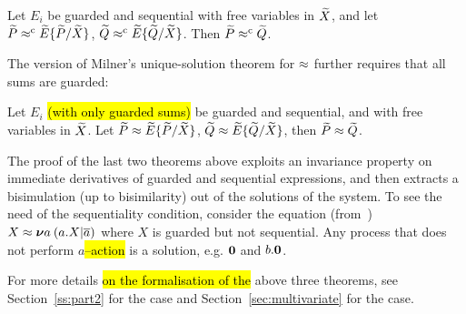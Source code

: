 \begin{theorem}
\label{t:Mil89s3}
Let $E_i$ be guarded and sequential with free
variables in $\widetilde X$, and let ${\widetilde P} \mathrel{\approx^{\rm{c}}} {\widetilde E}\{\widetilde P /\widetilde X\}$,
  ${\widetilde Q} \mathrel{\approx^{\rm{c}}} {\widetilde E}\{\widetilde Q /\widetilde X\}$. Then ${\widetilde P} \mathrel{\approx^{\rm{c}}} {\widetilde Q}$.
\end{theorem}

The version of Milner's unique-solution theorem for $\approx$ further requires
that all sums are guarded:
\begin{theorem}
\label{t:Mil89}
Let $E_i$   \hl{(with only guarded sums)}  be guarded and sequential,
and  with free
variables in $\widetilde X$. Let ${\widetilde P} \approx {\widetilde E}\{\widetilde P /\widetilde X\}$,
  ${\widetilde Q} \approx {\widetilde E}\{\widetilde Q /\widetilde X\}$, then ${\widetilde P} \approx {\widetilde Q}$.
\end{theorem}

The proof of the last two theorems above exploits an invariance
property on immediate derivatives
of guarded and sequential expressions, and then extracts a bisimulation
(up to bisimilarity) out of the solutions of the system.
To see the need of the sequentiality condition, consider
 the equation (from~\cite{Mil89}) $X \approx {\boldsymbol \nu} a\: (a. X | \overline{a})$
where $X$ is guarded but not sequential. Any process that does not perform
$a$\hl{--action} is a solution, e.g. ${\boldsymbol 0}$ and $b.{\boldsymbol 0}$.

For more details \hl{on the formalisation of the} above three theorems, see Section~\ref{ss:part2}
for the \univariate case and Section~\ref{sec:multivariate} for the \multivariate case.

